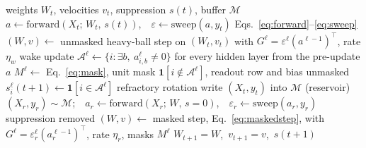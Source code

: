 \documentclass{article}
\begin{document}
\begin{algorithm}[t]
\caption{One waking step of the default system (rotation always on, one micro-batch per batch).}
\label{alg:step}
\begin{algorithmic}[1]
\REQUIRE weights $W_t$, velocities $v_t$, suppression $s(t)$, buffer $\mathcal{M}$
\STATE $a\leftarrow\mathrm{forward}(X_t;\,W_t,\,s(t))$,\ \ $\varepsilon\leftarrow\mathrm{sweep}(a,y_t)$ \hfill Eqs.~\eqref{eq:forward}--\eqref{eq:sweep}
\STATE $(W,v)\leftarrow$ unmasked heavy-ball step on $(W_t,v_t)$ with $G^\ell=\varepsilon^\ell(a^{\ell-1})^{\!\top}$, rate $\eta_w$ \hfill wake update
\STATE $\mathcal{A}^\ell\leftarrow\{i:\exists b,\ a^\ell_{i,b}\neq0\}$ for every hidden layer \hfill from the pre-update $a$
\STATE $M^\ell\leftarrow$ Eq.~\eqref{eq:mask}, unit mask $\mathbf{1}[i\notin\mathcal{A}^\ell]$, readout row and bias unmasked
\STATE $s^\ell_i(t{+}1)\leftarrow\mathbf{1}[i\in\mathcal{A}^\ell]$ \hfill refractory rotation
\STATE write $(X_t,y_t)$ into $\mathcal{M}$ (reservoir)
\STATE $(X_r,y_r)\sim\mathcal{M}$;\ \ $a_r\leftarrow\mathrm{forward}(X_r;\,W,\,s{=}0)$,\ \ $\varepsilon_r\leftarrow\mathrm{sweep}(a_r,y_r)$ \hfill suppression removed
\STATE $(W,v)\leftarrow$ masked step, Eq.~\eqref{eq:maskedstep}, with $G^\ell=\varepsilon^\ell_r(a^{\ell-1}_r)^{\!\top}$, rate $\eta_r$, masks $M^\ell$
\RETURN $W_{t+1}=W$,\ $v_{t+1}=v$,\ $s(t{+}1)$
\end{algorithmic}
\end{algorithm}
\end{document}
